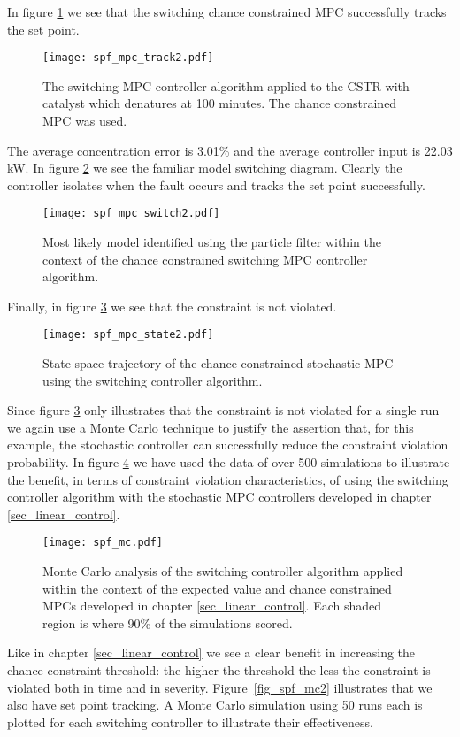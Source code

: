 In figure \ref{fig_spf_mpc_track2} we see that the switching chance constrained MPC successfully tracks the set point.
\begin{figure}[H] 
\centering
\texttt{[image: spf\_mpc\_track2.pdf]}
\caption{The switching MPC controller algorithm applied to the CSTR with catalyst which denatures at 100 minutes. The chance constrained MPC was used.}
\label{fig_spf_mpc_track2}
\end{figure}
The average concentration error is 3.01\% and the average controller input is 22.03 kW. In figure \ref{fig_spf_mpc_switch2} we see the familiar model switching diagram. Clearly the controller isolates when the fault occurs and tracks the set point successfully. 
\begin{figure}[H] 
\centering
\texttt{[image: spf\_mpc\_switch2.pdf]}
\caption{Most likely model identified using the particle filter within the context of the chance constrained switching MPC controller algorithm.}
\label{fig_spf_mpc_switch2}
\end{figure}
Finally, in figure \ref{fig_spf_mpc_state2} we see that the constraint is not violated.
\begin{figure}[H] 
\centering
\texttt{[image: spf\_mpc\_state2.pdf]}
\caption{State space trajectory of the chance constrained stochastic MPC using the switching controller algorithm.}
\label{fig_spf_mpc_state2}
\end{figure}
Since figure \ref{fig_spf_mpc_state2} only illustrates that the constraint is not violated for a single run we again use a Monte Carlo technique to justify the assertion that, for this example, the stochastic controller can successfully reduce the constraint violation probability. In figure \ref{fig_spf_mc} we have used the data of over 500 simulations to illustrate the benefit, in terms of constraint violation characteristics, of using the switching controller algorithm with the stochastic MPC controllers developed in chapter \ref{sec_linear_control}.
\begin{figure}[H] 
\centering
\texttt{[image: spf\_mc.pdf]}
\caption{Monte Carlo analysis of the switching controller algorithm applied within the context of the expected value and chance constrained MPCs developed in chapter \ref{sec_linear_control}. Each shaded region is where 90\% of the simulations scored.}
\label{fig_spf_mc}
\end{figure}
Like in chapter \ref{sec_linear_control} we see a clear benefit in increasing the chance constraint threshold: the higher the threshold the less the constraint is violated both in time and in severity. Figure~\ref{fig_spf_mc2} illustrates that we also have set point tracking. A Monte Carlo simulation using 50 runs each is plotted for each switching controller to illustrate their effectiveness.
